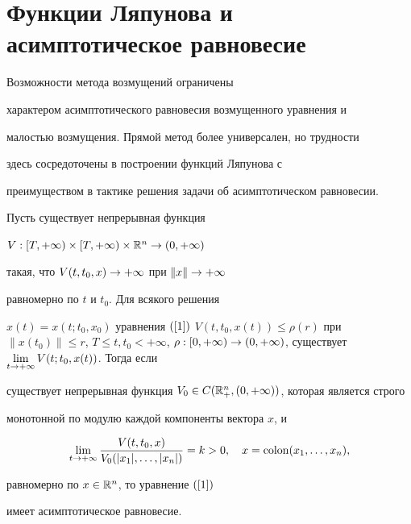 \section{Функции Ляпунова и асимптотическое равновесие}





Возможности метода возмущений \cite{5} ограничены


характером асимптотического равновесия возмущенного уравнения и


малостью возмущения. Прямой метод более универсален, но трудности


здесь сосредоточены в построении функций Ляпунова с


преимуществом в тактике решения задачи об асимптотическом равновесии.





\begin{thm}\label{T_7}


Пусть существует непрерывная функция


$V:[T,+\infty)\times [T,+\infty)\times {\Bbb R}^{n} \rightarrow (0,+\infty)$


такая, что $V(t,t_{0},x)\rightarrow +\infty$ при $\|x\|\rightarrow+\infty$


равномерно по $t$ и $t_{0}$. Для всякого решения


$x(t)=x(t;t_{0},x_{0})$ уравнения $(\ref{1})$ $V(t,t_{0},x(t))\leq


\rho (r)$ при $\|x(t_{0})\|\leq r$, $T\leq t, t_{0}<+\infty$, $\rho


:[0,+\infty)\rar (0,+\infty)$, существует $\lim


\limits_{t\rar +\infty}V(t;t_{0},x(t))$. Тогда если


существует непрерывная функция $V_{0}\in


C(\R^{n}_{+},(0,+\infty))$, которая является строго


монотонной по модулю каждой компоненты вектора $x$, и


$$


\lim\limits_{t\rar


+\infty}\frac{V(t,t_{0},x)}{V_{0}(|x_{1}|,


\dotsc,|x_{n}|)}=k>0,\quad x=\mathrm{colon}(x_{1},\dotsc,x_{n}),


$$


равномерно по $x\in {\Bbb R}^{n}$, то уравнение $(\ref{1})$


имеет асимптотическое равновесие.


\end{thm}






